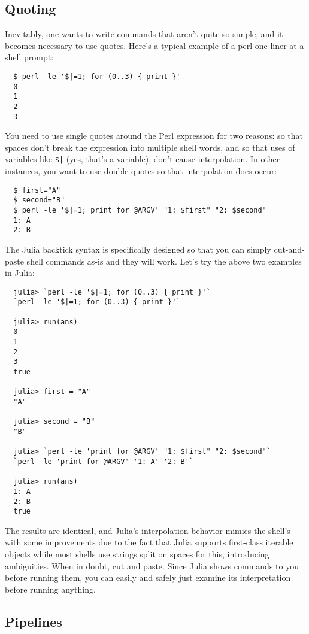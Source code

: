 \documentclass{article}
\begin{document}
\subsection{Quoting}

Inevitably, one wants to write commands that aren't quite so simple, and it becomes necessary to use quotes.
Here's a typical example of a perl one-liner at a shell prompt:
\begin{verbatim}
  $ perl -le '$|=1; for (0..3) { print }'
  0
  1
  2
  3
\end{verbatim}
You need to use single quotes around the Perl expression for two reasons:
so that spaces don't break the expression into multiple shell words, and so that uses of variables like \texttt{\$|} (yes, that's a variable), don't cause interpolation.
In other instances, you want to use double quotes so that interpolation does occur:
\begin{verbatim}
  $ first="A"
  $ second="B"
  $ perl -le '$|=1; print for @ARGV' "1: $first" "2: $second"
  1: A
  2: B
\end{verbatim}
The Julia backtick syntax is specifically designed so that you can simply cut-and-paste shell commands as-is and they will work.
Let's try the above two examples in Julia:
\begin{verbatim}
  julia> `perl -le '$|=1; for (0..3) { print }'`
  `perl -le '$|=1; for (0..3) { print }'`

  julia> run(ans)
  0
  1
  2
  3
  true

  julia> first = "A"
  "A"

  julia> second = "B"
  "B"

  julia> `perl -le 'print for @ARGV' "1: $first" "2: $second"`
  `perl -le 'print for @ARGV' '1: A' '2: B'`

  julia> run(ans)
  1: A
  2: B
  true
\end{verbatim}
The results are identical, and Julia's interpolation behavior mimics the shell's with some improvements due to the fact that Julia supports first-class iterable objects while most shells use strings split on spaces for this, introducing ambiguities.
When in doubt, cut and paste.
Since Julia shows commands to you before running them, you can easily and safely just examine its interpretation before running anything.

\subsection{Pipelines}
\end{document}

